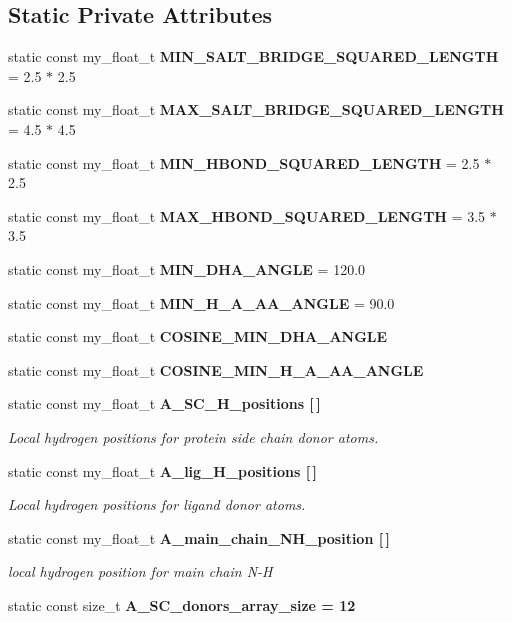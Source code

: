 \subsection*{Static Private Attributes}
\begin{CompactItemize}
\item 
static const my\_\-float\_\-t \textbf{MIN\_\-SALT\_\-BRIDGE\_\-SQUARED\_\-LENGTH} = 2.5 $\ast$ 2.5\label{classASCbase_1_1HbondGeometry_29c5c8d5d543d33470f10f31afd60d2f}

\item 
static const my\_\-float\_\-t \textbf{MAX\_\-SALT\_\-BRIDGE\_\-SQUARED\_\-LENGTH} = 4.5 $\ast$ 4.5\label{classASCbase_1_1HbondGeometry_69c3704548ade0b37b66654f5bae97df}

\item 
static const my\_\-float\_\-t \textbf{MIN\_\-HBOND\_\-SQUARED\_\-LENGTH} = 2.5 $\ast$ 2.5\label{classASCbase_1_1HbondGeometry_e2e30edec42fadce0889c782f6e59eeb}

\item 
static const my\_\-float\_\-t \textbf{MAX\_\-HBOND\_\-SQUARED\_\-LENGTH} = 3.5 $\ast$ 3.5\label{classASCbase_1_1HbondGeometry_6fba042f242b6e32bc9c14fd7341dbc3}

\item 
static const my\_\-float\_\-t \textbf{MIN\_\-DHA\_\-ANGLE} = 120.0\label{classASCbase_1_1HbondGeometry_196cfe032d7ed4df8990cee55cdcd687}

\item 
static const my\_\-float\_\-t \textbf{MIN\_\-H\_\-A\_\-AA\_\-ANGLE} = 90.0\label{classASCbase_1_1HbondGeometry_f80408c07c5fe34bbb7c095e2699ada3}

\item 
static const my\_\-float\_\-t \textbf{COSINE\_\-MIN\_\-DHA\_\-ANGLE}
\item 
static const my\_\-float\_\-t \textbf{COSINE\_\-MIN\_\-H\_\-A\_\-AA\_\-ANGLE}
\item 
static const my\_\-float\_\-t \bf{A\_\-SC\_\-H\_\-positions} [$\,$]
\begin{CompactList}\small\item\em Local hydrogen positions for protein side chain donor atoms. \item\end{CompactList}\item 
static const my\_\-float\_\-t \bf{A\_\-lig\_\-H\_\-positions} [$\,$]
\begin{CompactList}\small\item\em Local hydrogen positions for ligand donor atoms. \item\end{CompactList}\item 
static const my\_\-float\_\-t \bf{A\_\-main\_\-chain\_\-NH\_\-position} [$\,$]
\begin{CompactList}\small\item\em local hydrogen position for main chain N-H \item\end{CompactList}\item 
static const size\_\-t \bf{A\_\-SC\_\-donors\_\-array\_\-size} = 12\label{classASCbase_1_1HbondGeometry_309f9769bac2da03e5bfea01f3c6b205}


\end{CompactItemize}
